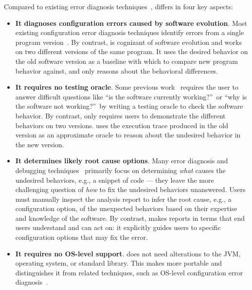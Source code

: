 Compared to existing error diagnosis
techniques~\cite{Wang:2004:AMT, Rabkin:2011:PPC, Whitaker:2004:CDS,
Zhang:2013:ADS, Attariyan:2010:ACT, Su:2007:AIC, Attariyan:2008:UCD, xray
}, \ourtool differs in four
key aspects:

\vspace{-1mm}

\begin{itemize}
\vspace{-1mm}
\item \textbf{It diagnoses configuration errors caused by software evolution}.
Most existing configuration error diagnosis techniques
identify errors from a single program
version~\cite{Wang:2004:AMT, Rabkin:2011:PPC, Whitaker:2004:CDS,
Zhang:2013:ADS, Attariyan:2010:ACT, Su:2007:AIC, Attariyan:2008:UCD, xray}.
By contrast, \ourtool is cognizant of software evolution and
works on two different versions of the same program. 
It uses the desired behavior on the old software version
as a baseline with which to compare new program behavior against, and only
reasons about the behavioral differences.

\item \textbf{It requires no testing oracle}.
Some previous work~\cite{Rabkin:2011:PPC, Whitaker:2004:CDS,
Attariyan:2010:ACT, Su:2007:AIC} requires the user to answer difficult
questions like ``is the software currently working?''\ or ``why is the
software not working?''\ by writing a testing
oracle to check the software behavior. By contrast,
\ourtool only requires users to
demonstrate the different behaviors on two versions.
\ourtool uses the execution trace produced in the old
version as an approximate oracle to
reason about the undesired behavior in the new version.

\item \textbf{It determines likely root cause options}.
Many error diagnosis and debugging techniques~\cite{dd, autoflow}
primarily focus on
determining \textit{what} causes the undesired behaviors, e.g.,
a snippet of code --- they leave the more challenging
question of \textit{how} to fix the undesired behaviors
unanswered.  Users must manually inspect the analysis
report to infer
the root cause, e.g., a configuration option,
of the unexpected behaviors 
based on their expertise and knowledge of the software.
By contrast, \ourtool makes reports in terms that 
end users understand and can act on:  it explicitly guides users to specific
configuration options that may fix the error.

\item \textbf{It requires no OS-level support}. \ourtool
does not need alterations to the JVM, operating system, or
standard library. This makes \ourtool more portable and
distinguishes it from related techniques, such as
OS-level configuration error diagnosis~\cite{Whitaker:2004:CDS, Su:2007:AIC}.

\end{itemize}

